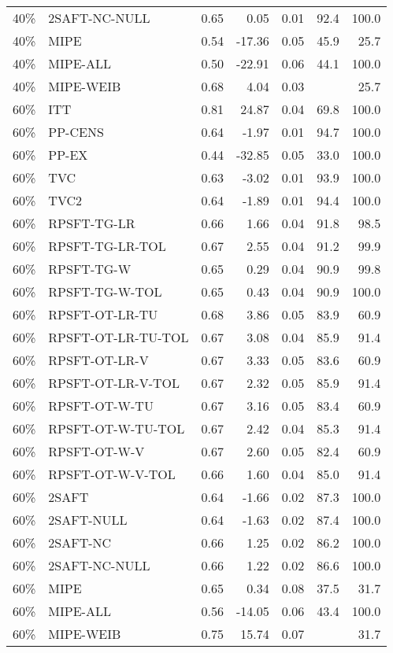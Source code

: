 \begin{table}[ht]
{\begin{tabular}{llrrrrr}
  40\% & 2SAFT-NC-NULL & 0.65 & 0.05 & 0.01 & 92.4 & 100.0 \\ 
  40\% & MIPE & 0.54 & -17.36 & 0.05 & 45.9 & 25.7 \\ 
  40\% & MIPE-ALL & 0.50 & -22.91 & 0.06 & 44.1 & 100.0 \\ 
  40\% & MIPE-WEIB & 0.68 & 4.04 & 0.03 &  & 25.7 \\ 
   \hline
60\% & ITT & 0.81 & 24.87 & 0.04 & 69.8 & 100.0 \\ 
  60\% & PP-CENS & 0.64 & -1.97 & 0.01 & 94.7 & 100.0 \\ 
  60\% & PP-EX & 0.44 & -32.85 & 0.05 & 33.0 & 100.0 \\ 
  60\% & TVC & 0.63 & -3.02 & 0.01 & 93.9 & 100.0 \\ 
  60\% & TVC2 & 0.64 & -1.89 & 0.01 & 94.4 & 100.0 \\ 
   \hline
60\% & RPSFT-TG-LR & 0.66 & 1.66 & 0.04 & 91.8 & 98.5 \\ 
  60\% & RPSFT-TG-LR-TOL & 0.67 & 2.55 & 0.04 & 91.2 & 99.9 \\ 
  60\% & RPSFT-TG-W & 0.65 & 0.29 & 0.04 & 90.9 & 99.8 \\ 
  60\% & RPSFT-TG-W-TOL & 0.65 & 0.43 & 0.04 & 90.9 & 100.0 \\ 
  60\% & RPSFT-OT-LR-TU & 0.68 & 3.86 & 0.05 & 83.9 & 60.9 \\ 
  60\% & RPSFT-OT-LR-TU-TOL & 0.67 & 3.08 & 0.04 & 85.9 & 91.4 \\ 
  60\% & RPSFT-OT-LR-V & 0.67 & 3.33 & 0.05 & 83.6 & 60.9 \\ 
  60\% & RPSFT-OT-LR-V-TOL & 0.67 & 2.32 & 0.05 & 85.9 & 91.4 \\ 
   \hline
60\% & RPSFT-OT-W-TU & 0.67 & 3.16 & 0.05 & 83.4 & 60.9 \\ 
  60\% & RPSFT-OT-W-TU-TOL & 0.67 & 2.42 & 0.04 & 85.3 & 91.4 \\ 
  60\% & RPSFT-OT-W-V & 0.67 & 2.60 & 0.05 & 82.4 & 60.9 \\ 
  60\% & RPSFT-OT-W-V-TOL & 0.66 & 1.60 & 0.04 & 85.0 & 91.4 \\ 
   \hline
60\% & 2SAFT & 0.64 & -1.66 & 0.02 & 87.3 & 100.0 \\ 
  60\% & 2SAFT-NULL & 0.64 & -1.63 & 0.02 & 87.4 & 100.0 \\ 
  60\% & 2SAFT-NC & 0.66 & 1.25 & 0.02 & 86.2 & 100.0 \\ 
  60\% & 2SAFT-NC-NULL & 0.66 & 1.22 & 0.02 & 86.6 & 100.0 \\ 
  60\% & MIPE & 0.65 & 0.34 & 0.08 & 37.5 & 31.7 \\ 
  60\% & MIPE-ALL & 0.56 & -14.05 & 0.06 & 43.4 & 100.0 \\ 
  60\% & MIPE-WEIB & 0.75 & 15.74 & 0.07 &  & 31.7 \\ 
   \hline
\end{tabular}
}
\end{table}
